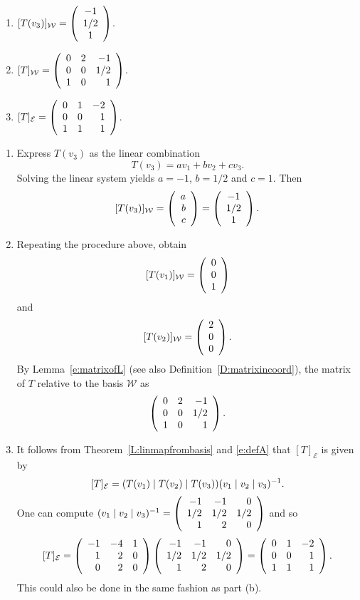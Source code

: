 \documentclass{ximera}
\begin{document}
\begin{exercise}
\begin{solution}
\ans
\begin{enumerate}[label=(\alph*)]
\item $[T(v_3)]_\mathcal{W} = \left(\begin{array}{cccccccccccc} -1 \\ 1/2\\ 1 \end{array}\right)$.
\item $[T]_{\mathcal{W}}=\left(\begin{array}{rrrrrrrrrrrrrrrrrr}  0& 2& -1\\ 0& 0& 1/2\\ 1& 0& 1 \end{array}\right)$.
\item $[T]_{\mathcal{E}}=\left(\begin{array}{rrrrrrrrrrrrrrrrrr} 0&1&-2 \\ 0&0& 1\\ 1&1&1 \end{array}\right)$.
\end{enumerate}
\soln  
\begin{enumerate}[label=(\alph*)]
\item Express $T(v_3)$ as the linear combination 
\[
T(v_3) = a v_1 + bv_2 + cv_3.
\]
Solving the linear system yields $a=-1$, $b=1/2$ and $c=1$.  Then 
\[
[T(v_3)]_\mathcal{W} = \left(\begin{array}{rrrrrrrrrrrrrrrrrr} a\\b\\c \end{array}\right) = \left(\begin{array}{cccccccccccc} -1 \\ 1/2\\ 1 \end{array}\right)\ldotp
\]
\item Repeating the procedure above, obtain
\[
[T(v_1)]_\mathcal{W} = \left(\begin{array}{rrrrrrrrrrrrrrrrrr} 0\\0\\1 \end{array}\right)
\]
and
\[
 [T(v_2)]_{\mathcal{W}} = \left(\begin{array}{rrrrrrrrrrrrrrrrrr} 2\\0\\0 \end{array}\right)\ldotp
\]
By Lemma~\ref{e:matrixofL} (see also Definition~\ref{D:matrixincoord}), the matrix of $T$ relative to the basis $\mathcal{W}$ as
\[
\left(\begin{array}{rrrrrrrrrrrrrrrrrr}  0& 2& -1\\ 0& 0& 1/2\\ 1& 0& 1 \end{array}\right)\ldotp
\]
\item It follows from Theorem~\ref{L:linmapfrombasis} and \eqref{e:defA} that $[T]_{\mathcal{E}}$ is given by 
\[
[T]_\mathcal{E}=(T(v_1)\mid T(v_2) \mid T(v_3))(v_1\mid v_2\mid v_3)^{-1}\ldotp
\]
One can compute $(v_1\mid v_2\mid v_3)^{-1}=\left(\begin{array}{rrrrrrrrrrrrrrrrrr}  -1 & -1 & 0 \\ 1/2 & 1/2 & 1/2 \\
 1 & 2 & 0 \end{array}\right)$ and so 
 \[
 [T]_\mathcal{E}=\left(\begin{array}{rrrrrrrrrrrrrrrrrr}  -1 & -4 & 1 \\ 1 & 2 & 0 \\ 0 & 2 & 0 \end{array}\right)\left(\begin{array}{rrrrrrrrrrrrrrrrrr}  -1 & -1 & 0 \\ 1/2 & 1/2& 1/2 \\ 1 & 2 & 0 \end{array}\right)=\left(\begin{array}{rrrrrrrrrrrrrrrrrr} 0&1&-2 \\ 0&0& 1\\ 1&1&1 \end{array}\right)\ldotp
 \]
 This could also be done in the same fashion as part (b).
 \end{enumerate}
\end{solution}
\end{exercise}
\end{document}

